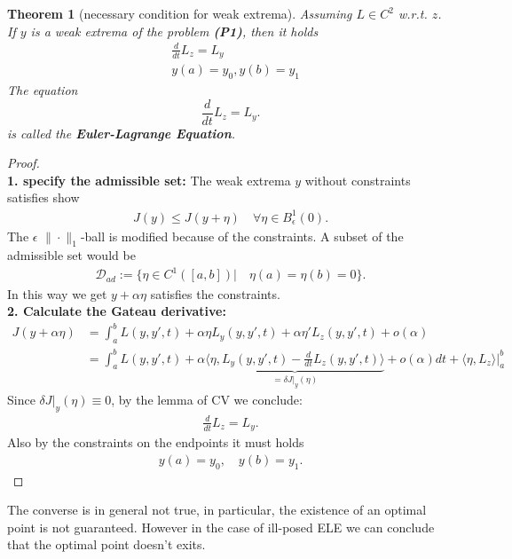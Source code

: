 \documentclass[a4paper,11pt,fleqn]{book}
\newtheorem{theorem}{Theorem}[section]
\theoremstyle{definition}
\theoremstyle{remark}
\begin{document}
\begin{theorem}[necessary condition for weak extrema]
	Assuming $L \in C^2$ w.r.t. $z$.  If $y$ is a weak extrema of the problem \textbf{(P1)}, then it holds
	\begin{equation}
	\begin{aligned}
		& \frac{d}{dt}L_{z} = L_y\\
		& y(a) = y_0, y(b) = y_1
	\end{aligned}
	\end{equation}
	The equation
	\begin{equation}
		\frac{d}{dt}L_z = L_y. 
	\end{equation}
	is called the \textbf{Euler-Lagrange Equation}.
\end{theorem}
\begin{proof}\quad\\
\textbf{1. specify the admissible set:} The weak extrema $y$ without constraints satisfies show 
\begin{align*}
	J(y) \le J(y + \eta) \quad \forall \eta \in B^1_\epsilon(0). 
\end{align*}
The $\epsilon$ $\|\cdot\|_1$-ball is modified because of the constraints. A subset of the admissible set would be
\begin{align*}
	\mathcal{D}_{ad}:= \{ \eta \in C^1([a, b])| \quad \eta(a) = \eta(b) = 0 \}.
\end{align*} 
In this way we get $y + \alpha \eta$ satisfies the constraints. 
\quad\\
\textbf{2. Calculate the Gateau derivative:}
	\begin{align*}
		J(y + \alpha \eta) &= \int_a^b L(y, y', t) + 
		 \alpha \eta  L_y(y, y', t) + \alpha \eta' L_z(y, y', t)
		 + o(\alpha)  \\
		& = \int_a^b L(y, y', t) + \alpha \underbrace{ \langle \eta, L_y(y, y', t) - \frac{d}{dt} L_{z}(y, y', t) \rangle}_{ = \delta J|_y(\eta)} + o(\alpha) dt + \langle \eta, L_z \rangle|_a^b   
	\end{align*}
Since $\delta J|_y(\eta) \equiv 0$, by the lemma of CV we conclude:
\begin{align*}
	\frac{d}{dt} L_z = L_y. 
\end{align*}
Also by the constraints on the endpoints it must holds
\begin{align*}
	y(a) = y_0, \quad y(b) = y_1. 
\end{align*}
\end{proof}

The converse is in general not true, in particular, the existence of an optimal point is not guaranteed. However in the case of ill-posed ELE we can conclude that the optimal point doesn't exits. 
\end{document}
